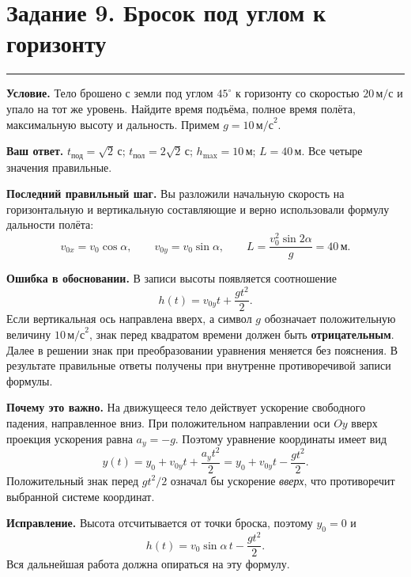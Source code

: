\documentclass[a4paper,12pt]{article}
\newcommand{\sectionline}{\par\vspace{2mm}\noindent\color{accent}\rule{\linewidth}{0.65pt}\color{black}\par\vspace{1mm}}
\newcommand{\lbl}[1]{\textbf{\color{darkaccent}#1}}
\begin{document}
\section*{Задание 9. Бросок под углом к горизонту}
\sectionline
\lbl{Условие.} Тело брошено с земли под углом $45^\circ$ к горизонту со скоростью $20\,\text{м/с}$ и упало на тот же уровень. Найдите время подъёма, полное время полёта, максимальную высоту и дальность. Примем $g=10\,\text{м/с}^2$.

\lbl{Ваш ответ.} $t_{\text{под}}=\sqrt2\,\text{с}$; $t_{\text{пол}}=2\sqrt2\,\text{с}$; $h_{\max}=10\,\text{м}$; $L=40\,\text{м}$. Все четыре значения правильные.

\lbl{Последний правильный шаг.} Вы разложили начальную скорость на горизонтальную и вертикальную составляющие и верно использовали формулу дальности полёта:
\[
 v_{0x}=v_0\cos\alpha,\qquad v_{0y}=v_0\sin\alpha,\qquad
 L=\frac{v_0^2\sin 2\alpha}{g}=40\,\text{м}.
\]

\textcolor{red!75!black}{\textbf{Ошибка в обосновании.}} В записи высоты появляется соотношение
\[
 h(t)=v_{0y}t+\frac{gt^2}{2}.
\]
Если вертикальная ось направлена вверх, а символ $g$ обозначает положительную величину $10\,\text{м/с}^2$, знак перед квадратом времени должен быть \textbf{отрицательным}. Далее в решении знак при преобразовании уравнения меняется без пояснения. В результате правильные ответы получены при внутренне противоречивой записи формулы.

\lbl{Почему это важно.} На движущееся тело действует ускорение свободного падения, направленное вниз. При положительном направлении оси $Oy$ вверх проекция ускорения равна $a_y=-g$. Поэтому уравнение координаты имеет вид
\[
 y(t)=y_0+v_{0y}t+\frac{a_yt^2}{2}
     =y_0+v_{0y}t-\frac{gt^2}{2}.
\]
Положительный знак перед $gt^2/2$ означал бы ускорение \emph{вверх}, что противоречит выбранной системе координат.

\lbl{Исправление.} Высота отсчитывается от точки броска, поэтому $y_0=0$ и
\[
 \boxed{h(t)=v_0\sin\alpha\,t-\frac{gt^2}{2}}.
\]
Вся дальнейшая работа должна опираться на эту формулу.

\newpage
\end{document}
